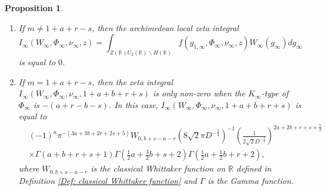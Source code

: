 \documentclass[11pt, a4paper]{amsart}
\theoremstyle{plain}
\newtheorem{proposition}[theorem]{Proposition}
\theoremstyle{definition}
\numberwithin{equation}{section}
\def\RR{\mathbb{R}}
\begin{document}
\begin{proposition}
\label{Prop:Arch_Zeta}
        \begin{enumerate}
            \item If $m \neq 1 + a + r - s$,  then the archimedean local zeta integral 
                    \begin{equation*}
                        I_{\infty}(W_{\infty}, \Phi_{\infty}, \nu_{\infty}, z) = \int_{Z(\RR)U_{2}(\RR) \backslash H(\RR)} f(g_{1, \infty}, \Phi_{\infty}, \nu_{\infty}, z) W_{\infty}(g_{\infty}) dg_{\infty}
                    \end{equation*} is equal to $0$. 
            \item If $m = 1 + a + r - s$, then the zeta integral $I_{\infty}(W_{\infty}, \Phi_{\infty}, \nu_{\infty}, 1 + a + b + r + s)$ is only non-zero when the $K_{\infty}$-type of $\Phi_{\infty}$ is $-(a + r -b - s)$.  In this case,  $I_{\infty}(W_{\infty}, \Phi_{\infty}, \nu_{\infty}, 1 + a + b + r + s)$ is equal to
            \begin{align*}
                &  (-1)^{a} \pi^{-(3a + 3b + 2r + 2s + 5)} W_{0, b + s - a - r}(8\sqrt{2}\pi D^{-\frac{3}{4}})^{-1}\left(\frac{1}{2\sqrt{2}D^{-\frac{3}{4}}}\right)^{2a + 2b + r + s + \frac{7}{2}} \\
                & \times \Gamma(a + b + r + s + 1) \Gamma\left( \frac{1}{2}a + \frac{3}{2}b + s + 2\right) \Gamma\left(\frac{1}{2}a + \frac{1}{2} b + r + 2\right), 
            \end{align*}
            where $W_{0,b + s - a - r}$ is the classical Whittaker function on $\RR$ defined in Definition \ref{Def: classical Whittaker function} and $\Gamma$ is the Gamma function. 
        \end{enumerate}
\end{proposition}
\end{document}
